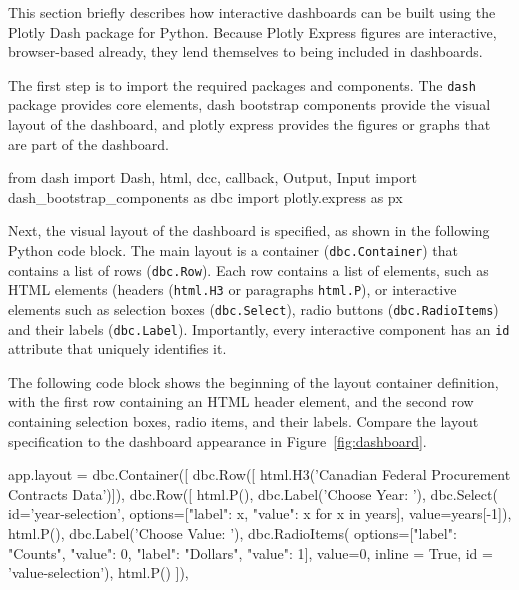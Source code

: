 This section briefly describes how interactive dashboards can be built using the Plotly Dash package for Python. Because Plotly Express figures are interactive, browser-based already, they lend themselves to being included in dashboards. 

The first step is to import the required packages and components. The \texttt{dash} package provides core elements, dash bootstrap components provide the visual layout of the dashboard, and plotly express provides the figures or graphs that are part of the dashboard.

\begin{samepage}
\begin{pythoncode}
from dash import Dash, html, dcc, callback, Output, Input
import dash_bootstrap_components as dbc
import plotly.express as px
\end{pythoncode}
\end{samepage}

Next, the visual layout of the dashboard is specified, as shown in the following Python code block. The main layout is a container (\texttt{dbc.Container}) that contains a list of rows (\texttt{dbc.Row}). Each row contains a list of elements, such as HTML elements (headers (\texttt{html.H3} or paragraphs \texttt{html.P}), or interactive elements such as selection boxes (\texttt{dbc.Select}), radio buttons (\texttt{dbc.RadioItems}) and their labels (\texttt{dbc.Label}). Importantly, every interactive component has an \texttt{id} attribute that uniquely identifies it. 

The following code block shows the beginning of the layout container definition, with the first row containing an HTML header element, and the second row containing selection boxes, radio items, and their labels. Compare the layout specification to the dashboard appearance in Figure~\ref{fig:dashboard}.

\begin{samepage}
\begin{pythoncode}
app.layout = dbc.Container([
  dbc.Row([
    html.H3('Canadian Federal Procurement Contracts Data')]),
  dbc.Row([
    html.P(),
    dbc.Label('Choose Year: '),
    dbc.Select(
      id='year-selection',
      options=[{"label": x, "value": x} for x in years],
      value=years[-1]),
    html.P(),
    dbc.Label('Choose Value: '),
    dbc.RadioItems(
      options=[{"label": "Counts", "value": 0},
               {"label": "Dollars", "value": 1}],
      value=0, inline = True,
      id = 'value-selection'),
    html.P() ]),
\end{pythoncode}
\end{samepage}

